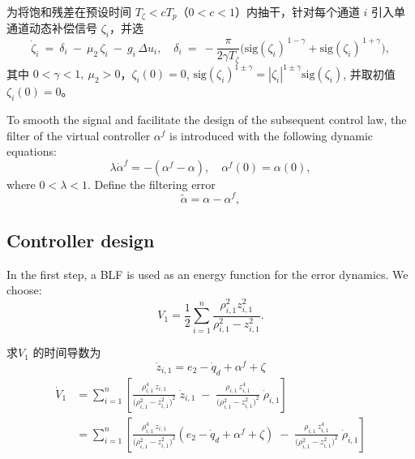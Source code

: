 \documentclass[pdflatex,sn-mathphys-num]{sn-jnl}%
\theoremstyle{thmstyleone}%
\theoremstyle{thmstyletwo}%
\theoremstyle{thmstylethree}%
\begin{document}
为将饱和残差在预设时间 $T_\zeta<cT_p$（$0<c<1$）内抽干，针对每个通道 $i$ 引入单通道动态补偿信号 $\zeta_{i}$，并选
\begin{equation}\label{eq:zeta2-pts}
\dot\zeta_i \ =\ \delta_i\ -\ \mu_2\,\zeta_i\ -\ g_i\,\Delta u_i,\quad
\delta_i\ =\ -\frac{\pi}{2\gamma T_\zeta}\Big(\mathrm{sig}(\zeta_i)^{\,1-\gamma}+\mathrm{sig}(\zeta_i)^{\,1+\gamma}\Big),
\end{equation}
其中 $0<\gamma<1,\ \mu_2>0$，$\zeta_i(0)=0$, $\mathrm{sig}(\zeta_i)^{1\pm \gamma}=|\zeta_i|^{1\pm \gamma}\mathrm{sig}(\zeta_i)$, 并取初值 $\zeta_{i}(0)=0$。



 To smooth the signal and facilitate the design of the subsequent control law, the filter of the virtual controller $\alpha^{f}$ is introduced with the following dynamic equations:
\begin{equation}\label{eq:22}
	\lambda \dot{\alpha}^{f}
	= -\left(\alpha^{f}-\alpha\right),
	\quad
	\alpha^{f}(0)=\alpha(0),
\end{equation}
where $0<\lambda<1$. Define the filtering error 
\begin{equation}\label{eq:23}
	\tilde{\alpha}= \alpha-\alpha^{f},
\end{equation}


\subsection{Controller design}



In the first step, a BLF is used as an energy function for the error dynamics. We choose:
\begin{equation}\label{eq:25}
	V_1= \frac{1}{2}\sum_{i=1}^{n} \frac{\rho_{i,1}^2 z_{i,1}^2}{\rho_{i,1}^2-z_{i,1}^2}. 
\end{equation}

求$V_1$ 的时间导数为
$$\dot z_{i,1}= e_{2} - \dot{q}_{d}+\alpha^{f}+\zeta$$
\begin{equation}\label{eq:25}
	\begin{aligned}
\dot V_1
&=\sum_{i=1}^{n}\left[
\frac{\rho_{i,1}^4\,z_{i,1}}{\big(\rho_{i,1}^{2}-z_{i,1}^{2}\big)^{2}}\;\dot z_{i,1}
\;-\;
\frac{\rho_{i,1}\,z_{i,1}^{4}}{\big(\rho_{i,1}^{2}-z_{i,1}^{2}\big)^{2}}\;\dot \rho_{i,1}
\right]\\
&=\sum_{i=1}^{n}\left[
\frac{\rho_{i,1}^4\,z_{i,1}}{\big(\rho_{i,1}^{2}-z_{i,1}^{2}\big)^{2}}(e_{2} -\dot{q}_{d}+\alpha^{f}+\zeta)
\;-\;
\frac{\rho_{i,1}\,z_{i,1}^{4}}{\big(\rho_{i,1}^{2}-z_{i,1}^{2}\big)^{2}}\;\dot \rho_{i,1}
\right]
\end{aligned}
\end{equation}
\end{document}
